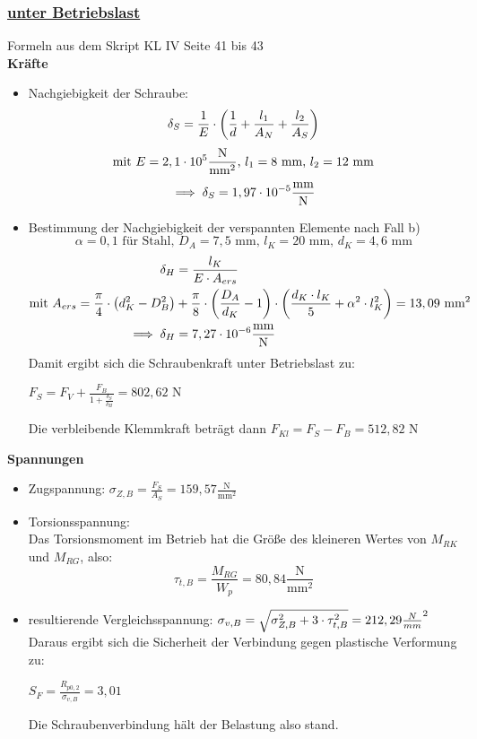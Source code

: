 \subsubsection{\underline{unter Betriebslast}}
Formeln aus dem Skript KL IV  Seite 41 bis 43 \\
\textbf{Kräfte}
\begin{itemize}
	\item Nachgiebigkeit der Schraube:
	\[\delta_S = \frac{1}{E}\cdot \left(\frac{1}{d}+\frac{l_1}{A_N}+\frac{l_2}{A_S}\right)\]
	\[\text{mit } E = 2,1\cdot 10^5 \frac{\text{N}}{\text{mm}^2} \text{, } l_1 = 8 \text{ mm, } l_2 = 12 \text{ mm}\]
	\[\implies \delta_S = 1,97\cdot 10^{-5} \frac{\text{mm}}{\text{N}}\]
	\item Bestimmung der Nachgiebigkeit der verspannten Elemente nach Fall b)
	\[\alpha = 0,1 \text{ für Stahl, } D_A = 7,5 \text{ mm, } l_K = 20 \text{ mm, } d_K = 4,6 \text{ mm}\]
	\begin{align*}
	\delta_H &= \frac{l_K}{E\cdot A_{ers}}\\
	\text{mit } A_{ers} = \frac{\pi}{4}\cdot \left(d_K^2 -D_B^2\right) &+ \frac{\pi}{8}\cdot\left(\frac{D_A}{d_K}-1\right)\cdot\left(\frac{d_K\cdot l_K}{5}+ \alpha^2\cdot l_K^2\right) = 13,09 \text{ mm}^2\\
	\implies \delta_H &= 7,27\cdot 10^{-6} \frac{\text{mm}}{\text{N}}
	\end{align*}
	Damit ergibt sich die Schraubenkraft unter Betriebslast zu: \\
	\begin{center}
		$F_S = F_V+ \frac{F_B}{1+\frac{\delta_S}{\delta_H}} = 802,62 \text{ N}$
	\end{center}
	Die verbleibende Klemmkraft beträgt dann $ F_{Kl} = F_S-F_B = 512,82 \text{ N}$
\end{itemize}
\newpage
\textbf{Spannungen}
\begin{itemize}
	\item Zugspannung:
	$\sigma_{Z,B} = \frac{F_S}{A_S} = 159,57 \frac{\text{N}}{\text{mm}^2}$\\
	\item Torsionsspannung:\\
	\vspace{0.3cm}
	Das Torsionsmoment im Betrieb hat die Größe des kleineren Wertes von $M_{RK}$ und $M_{RG}$, also: 
	\[\tau_{t,B} = \frac{M_{RG}}{W_p} = 80,84 \frac{\text{N}}{\text{mm}^2}\]
	\item resultierende Vergleichsspannung: $\sigma_{v,B} = \sqrt{\sigma_{Z,B}^2+3\cdot \tau_{t,B}^2} = 212,29 \frac{N}{mm}^2$\\
	\vspace{.5cm}
	Daraus ergibt sich die Sicherheit der Verbindung gegen plastische Verformung zu: 
	\begin{center}
		$S_F = \frac{R_{p0,2}}{\sigma_{v,B}} = 3,01$
	\end{center}
	Die Schraubenverbindung hält der Belastung also stand.
\end{itemize}
